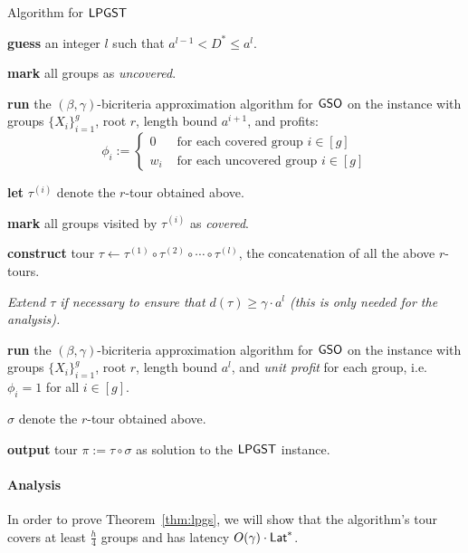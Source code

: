 \documentclass[11pt]{article}
\def\lat{{\sf Lat}\xspace}
\newcommand{\profit}{\phi}
\def\lpgst{\ensuremath{{\sf LPGST}}\xspace}
\def\gso{\ensuremath{{\sf GSO}}\xspace}
\begin{document}
\begin{algorithm}[ht]
  \caption{Algorithm for \lpgst}
  \label{alg:lpgst}
  \begin{algorithmic}[1]
    \STATE \label{step:grpSt:0} \textbf{guess} an integer $l$ such that $a^{l-1} < D^* \le a^l$.

    \STATE \textbf{mark} all groups as {\em uncovered}.


    \STATE \label{step:grpSt:1} \textbf{run} the $(\beta, \gamma)$-bicriteria approximation algorithm for \gso  on the instance with
    groups $\{X_i\}_{i=1}^g$, root $r$, length bound $a^{i+1}$, and profits:
    $$\profit_i:=\left\{
      \begin{array}{ll}
        0 & \mbox{ for each covered group }i\in [g]\\
        w_i & \mbox{ for each uncovered group }i\in [g]
      \end{array}\right.
    $$

    \STATE \textbf{let} $\tau^{(i)}$ denote the $r$-tour obtained above.

    \STATE \textbf{mark} all groups visited by $\tau^{(i)}$ as {\em
      covered}.

    \ENDFOR

    \STATE \label{step:grpSt:3'} \textbf{construct} tour $\tau\leftarrow \tau^{(1)} \circ
    \tau^{(2)} \circ \cdots \circ \tau^{(l)}$, the concatenation of all the above
    $r$-tours. 
    
    \STATE \label{step:grpSt:3} {\em Extend $\tau$ if necessary to ensure that $d(\tau)\ge \gamma\cdot a^l$ (this is only needed for the analysis).}

    \STATE \label{step:grpSt:2} \textbf{run} the $(\beta, \gamma)$-bicriteria approximation algorithm for \gso  on the instance with groups $\{X_i\}_{i=1}^g$, root $r$,
    length bound $a^l$, and {\em unit profit} for each group, i.e. $\profit_i=1$ for all $i\in[g]$. 
    
     $\sigma$ denote the
  $r$-tour obtained above.

    \STATE \textbf{output} tour $\pi:= \tau\circ\sigma$ as solution to the \lpgst instance.
  \end{algorithmic}
\end{algorithm}




\paragraph{Analysis} 
In order to prove Theorem~\ref{thm:lpgs}, we will show that the algorithm's tour covers at least $\frac{h}4$ groups and has latency $O(\gamma)\cdot \lat^*$.
\end{document}
